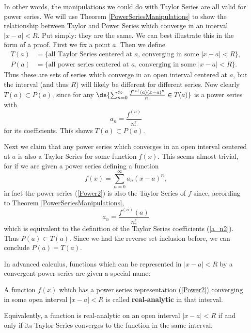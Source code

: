 In other words, the manipulations we could do with 
Taylor Series are all valid for power series.
We will use Theorem \ref{PowerSeriesManipulations} to
show the relationship between Taylor and Power Series
which converge in an interval $|x-a|<R$.  Put simply: 
they are the same.  
We can best illustrate  this in the form of a proof.
First we fix a point $a$.  Then we define
\begin{align*}T(a)&=\{\text{all Taylor Series centered at $a$,
converging in some }|x-a|<R\},\\
	P(a)&=\{\text{all power series centered at $a$,
converging in some }|x-a|<R\}.
\end{align*}
Thus these are sets of series which converge in an open interval
centered at $a$, but the interval (and thus $R$)
 will likely be different for different
series.  Now clearly $T(a)\subset P(a)$, since for any $\ds{\sum_{n=0}^\infty
\frac{f^{(n)}(a)(x-a)^n}{n!}\in T(a)}$ is a power series
with 
\begin{equation}a_n=\frac{f^{(n)}}{n!}\label{a_n2}\end{equation}
 for its coefficients.
This shows $T(a)\subset P(a)$.  

Next we claim that any power series which converges in
an open interval centered at $a$ is also a Taylor Series
for some function $f(x)$. This seems almost trivial, for
if we are given a power series defining a function 
\begin{equation}f(x)=\sum_{n=0}^\infty a_n(x-a)^n,\label{Power2} \end{equation} 
in fact the power series (\ref{Power2}) is also the Taylor Series 
of $f$ since, according to Theorem \ref{PowerSeriesManipulations},  
\begin{equation}a_n=\frac{f^{(n)}(a)}{n!}\end{equation} 
which is equivalent to the definition of the Taylor Series
coefficients (\ref{a_n2}).  
Thus $P(a)\subset T(a)$.  Since we had the
reverse set inclusion before, we can conclude 
$P(a)=T(a)$. 

In advanced calculus, functions which can be represented in
$|x-a|<R$  by a  convergent
power series are given a special name:
\begin{definition} A function $f(x)$ which has a
power series representation {\rm(\ref{Power2})} converging in
some open interval $|x-a|<R$ is called 
{\bf real-analytic} in that interval.
\end{definition}
Equivalently, a function is real-analytic  on an open interval
$|x-a|<R$ if and only if its Taylor Series
converges to the function in the same interval. 
 
